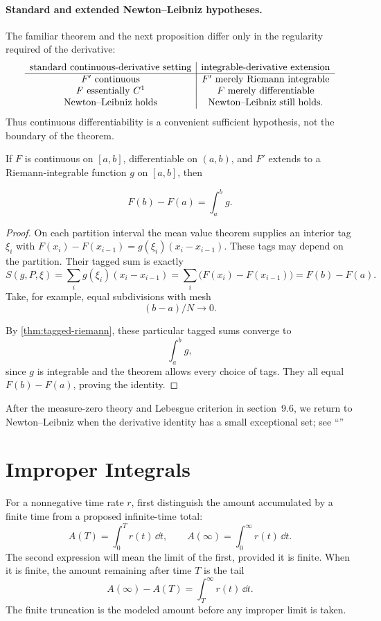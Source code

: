 \paragraph{Standard and extended Newton--Leibniz hypotheses.}
The familiar theorem and the next proposition differ only in the regularity
required of the derivative:
\[
\begin{array}{c|c}
\text{standard continuous-derivative setting}
&\text{integrable-derivative extension}\cr\hline
F'\text{ continuous}&F'\text{ merely Riemann integrable}\cr
F\text{ essentially }C^1&F\text{ merely differentiable}\cr
\text{Newton--Leibniz holds}&\text{Newton--Leibniz still holds}.
\end{array}
\]
Thus continuous differentiability is a convenient sufficient hypothesis,
not the boundary of the theorem.

\begin{proposition}
\label{prop:newton-leibniz-integrable}
If $F$ is continuous on $[a,b]$, differentiable on $(a,b)$, and $F'$
extends to a Riemann-integrable function $g$ on $[a,b]$, then

\[
F(b)-F(a)=\int_a^b g.
\]

\end{proposition}
\begin{proof}
On each partition interval the mean value theorem supplies an interior tag
$\xi_i$ with $F(x_i)-F(x_{i-1})=g(\xi_i)(x_i-x_{i-1})$.
These tags may depend on the partition. Their tagged sum is exactly
\[
S(g,P,\xi)=\sum_i g(\xi_i)(x_i-x_{i-1})
 =\sum_i\bigl(F(x_i)-F(x_{i-1})\bigr)=F(b)-F(a).
\]
Take, for example, equal subdivisions with mesh
\[
(b-a)/N\to0.
\]

By \cref{thm:tagged-riemann}, these particular tagged sums converge
to
\[
\int_a^b g,
\]
 since $g$ is integrable and the theorem allows every
choice of tags. They all equal $F(b)-F(a)$, proving the identity.
\end{proof}

After the measure-zero theory and Lebesgue criterion in section~9.6,
we return to Newton--Leibniz when the derivative identity has a small
exceptional set; see ``''

\section{Improper Integrals}

For a nonnegative time rate $r$, first distinguish the amount accumulated
by a finite time from a proposed infinite-time total:
\[
A(T)=\int_0^T r(t)\,\dd t,
\qquad A(\infty)=\int_0^\infty r(t)\,\dd t.
\]
The second expression will mean the limit of the first, provided it is
finite. When it is finite, the amount remaining after time $T$ is the tail
\[
A(\infty)-A(T)=\int_T^\infty r(t)\,\dd t.
\]
The finite truncation is the modeled amount before any improper limit is taken.


